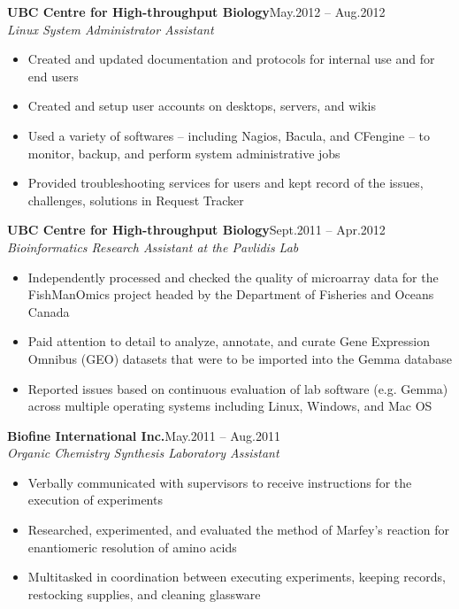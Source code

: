 \documentclass{res}
\begin{document}
\begin{resume}
{\bf UBC Centre for High-throughput Biology}\hfill May.2012 -- Aug.2012\\
{\sl Linux System Administrator Assistant}
\begin{itemize} \itemsep -2pt
  \item Created and updated documentation and protocols for internal use and for end users
  \item Created and setup user accounts on desktops, servers, and wikis
  \item Used a variety of softwares -- including Nagios, Bacula, and CFengine -- to monitor, backup, and perform system administrative jobs
  \item Provided troubleshooting services for users and kept record of the issues, challenges, solutions in Request Tracker
\end{itemize}

{\bf UBC Centre for High-throughput Biology}\hfill Sept.2011 -- Apr.2012\\
{\sl Bioinformatics Research Assistant at the Pavlidis Lab}
\begin{itemize} \itemsep -2pt
  \item Independently processed and checked the quality of microarray data for the FishManOmics project headed by the Department of Fisheries and Oceans Canada
  \item Paid attention to detail to analyze, annotate, and curate Gene Expression Omnibus (GEO) datasets that were to be imported into the Gemma database
  \item Reported issues based on continuous evaluation of lab software (e.g. Gemma) across multiple operating systems including Linux, Windows, and Mac OS
\end{itemize}

{\bf Biofine International Inc.}\hfill May.2011 -- Aug.2011\\
{\sl Organic Chemistry Synthesis Laboratory Assistant}
\begin{itemize} \itemsep -2pt
  \item Verbally communicated with supervisors to receive instructions for the execution of experiments
  \item Researched, experimented, and evaluated the method of Marfey's reaction for enantiomeric resolution of amino acids
  \item Multitasked in coordination between executing experiments, keeping records, restocking supplies, and cleaning glassware
\end{itemize}


\end{resume}
\end{document}
